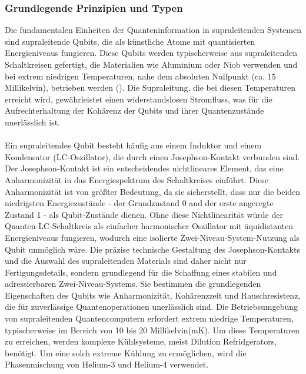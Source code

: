 \subsubsection{Grundlegende Prinzipien und Typen}
Die fundamentalen Einheiten der Quanteninformation in supraleitenden Systemen sind supraleitende Qubits, die als künstliche Atome mit quantisierten Energieniveaus fungieren. Diese Qubits werden typischerweise aus supraleitenden Schaltkreisen gefertigt, die Materialien wie Aluminium oder Niob verwenden und bei extrem niedrigen Temperaturen, nahe dem absoluten Nullpunkt (ca. 15 Millikelvin), betrieben werden (\cite{noauthor_ultimate_2025}). Die Supraleitung, die bei diesen Temperaturen erreicht wird, gewährleistet einen widerstandslosen Stromfluss, was für die Aufrechterhaltung der Kohärenz der Qubits und ihrer Quantenzustände unerlässlich ist.
\\\\
Ein supraleitendes Qubit besteht häufig aus einem Induktor und einem Kondensator (LC-Oszillator), die durch einen Josephson-Kontakt verbunden sind. Der Josephson-Kontakt ist ein entscheidendes nichtlineares Element, das eine Anharmonizität in das Energiespektrum des Schaltkreises einführt. Diese Anharmonizität ist von größter Bedeutung, da sie sicherstellt, dass nur die beiden niedrigsten Energiezustände - der Grundzustand 0 and der erste angeregte Zustand 1 - als Qubit-Zustände dienen. Ohne diese Nichtlinearität würde der Quanten-LC-Schaltkreis als einfacher harmonischer Oszillator mit äquidistanten Energieniveaus fungieren, wodurch eine isolierte Zwei-Niveau-System-Nutzung als Qubit unmöglich wäre. Die präzise technische Gestaltung des Josephson-Kontakts und die Auswahl des supraleitenden Materials sind daher nicht nur Fertigungsdetails, sondern grundlegend für die Schaffung eines stabilen und adressierbaren Zwei-Niveau-Systems. Sie bestimmen die grundlegenden Eigenschaften des Qubits wie Anharmonizität, Kohärenzzeit und Rauschresistenz, die für zuverlässige Quantenoperationen unerlässlich sind. Die Betriebsumgebung von supraleitenden Quantencomputern erfordert extrem niedrige Temperaturen, typischerweise im Bereich von 10 bis 20 Millikelvin(mK). Um diese Temperaturen zu erreichen, werden komplexe Kühlsysteme, meist Dilution Refridgerators, benötigt. Um eine solch extreme Kühlung zu ermöglichen, wird die Phasenmischung von Helium-3 und Helium-4 verwendet.
\\\\
